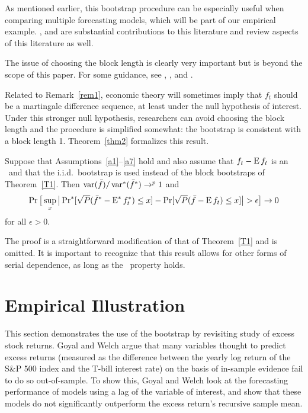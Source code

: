 \documentclass[12pt,fleqn]{article}
\begin{document}
\begin{rem}
  As mentioned earlier, this bootstrap procedure can be especially
  useful when comparing multiple forecasting models, which will be
  part of our empirical example. \cite{Whi:00}, \cite{Han:05} and
  \cite{RoW:05} are substantial contributions to this literature and
  \cite{RSW:08} review aspects of this literature as well.
\end{rem}

\begin{rem}\label{rem1}
  The issue of choosing the block length is clearly very important but
  is beyond the scope of this paper. For some guidance, see
  \cite{PoW:04}, \cite{RoW:06}, and \cite{PPW:09}.
\end{rem}

Related to Remark~\ref{rem1}, economic theory will sometimes imply
that $f_t$ should be a martingale difference sequence, at least under
the null hypothesis of interest. Under this stronger null hypothesis,
researchers can avoid choosing the block length and the procedure is
simplified somewhat: the bootstrap is consistent with a block length 1.
Theorem~\ref{thm2} formalizes this result.

\begin{thm}\label{thm2}
  Suppose that Assumptions~\ref{a1}--\ref{a7} hold and also assume
  that $f_t - \operatorname{E} f_t$ is an \mds\ and that the i.i.d.\ bootstrap is
  used instead of the block bootstraps of Theorem~\ref{T1}. Then
  $\operatorname{var}(\bar f)/\operatorname{var}^*(\bar f^*) \to^p 1$
  and
  \begin{equation}\label{eq:20}
    \operatorname{Pr}\big[\sup_x \big\lvert \operatorname{Pr}^*[\sqrt{P} (\bar f^* - \operatorname{E}^* f_t^*) \leq x]
    - \operatorname{Pr}[\sqrt{P}( \bar{f} - \operatorname{E} f_t) \leq x] \big\rvert > \epsilon\big] \to 0
  \end{equation}
  for all $\epsilon > 0$.
\end{thm}

The proof is a straightforward modification of that of
Theorem~\ref{T1} and is omitted. It is important to recognize that
this result allows for other forms of serial dependence, as long as
the \mds\ property holds.

\section{Empirical Illustration}\label{sec:3}

This section demonstrates the use of the bootstrap by revisiting
 study of excess stock returns. Goyal and Welch argue
that many variables thought to predict excess returns (measured as the
difference between the yearly log return of the S\&P 500 index and the
T-bill interest rate) on the basis of in-sample evidence fail to do so
out-of-sample.  To show this, Goyal and Welch look at the forecasting
performance of models using a lag of the variable of interest, and
show that these models do not significantly outperform the excess
return's recursive sample mean.
\end{document}
